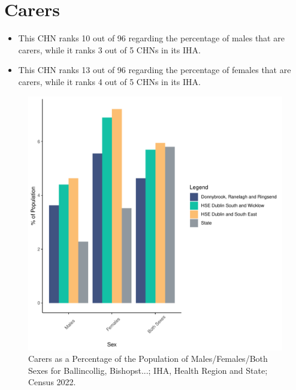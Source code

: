 \documentclass{article}
\begin{document}
\section{Carers}\label{sect:Carers}
\begin{itemize}
\item This CHN ranks  10 out of 96 regarding the percentage of males that are carers, while it ranks   3 out of 5 CHNs in its IHA.
\item This CHN ranks  13 out of 96 regarding the percentage of females that are carers, while it ranks   4 out of 5 CHNs in its IHA.
\end{itemize}
\begin{figure}[H]
	\centering
	\includegraphics[width = 150mm]{../figures/CareED.pdf}
	\caption{Carers as a Percentage of the Population of Males/Females/Both Sexes for Ballincollig, Bishopst...; IHA, Health Region and State; Census 2022.}
	\label{fig:2ae19629-1a6a-13a3-e055-000000000001}
	\end{figure}
\end{document}
